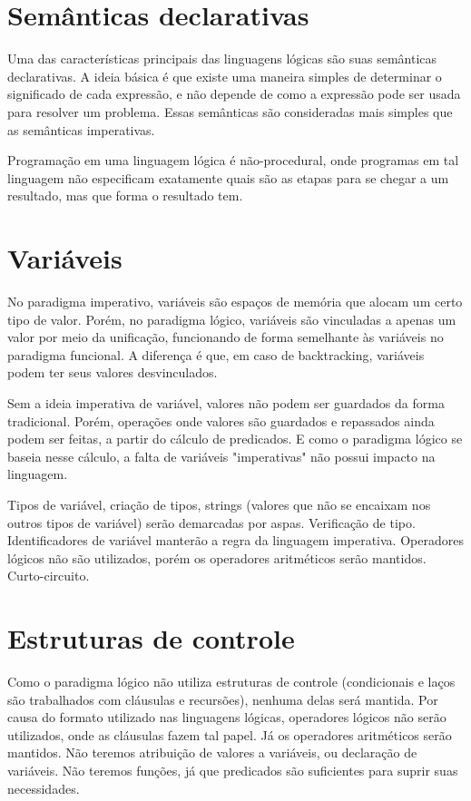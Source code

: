 \documentclass[12pt, a4paper]{article}
\begin{document}
\section{Semânticas declarativas}
Uma das características principais das linguagens lógicas são suas
semânticas declarativas. A ideia básica é que existe uma maneira
simples de determinar o significado de cada expressão, e não depende de
como a expressão pode ser usada para resolver um problema. Essas
semânticas são consideradas mais simples que as semânticas imperativas.

Programação em uma linguagem lógica é não-procedural, onde programas em
tal linguagem não especificam exatamente quais são as etapas para se
chegar a um resultado, mas que forma o resultado tem.

\section{Variáveis}
No paradigma imperativo, variáveis são espaços de memória que alocam um
certo tipo de valor. Porém, no paradigma lógico, variáveis são
vinculadas a apenas um valor por meio da unificação, funcionando de
forma semelhante às variáveis no paradigma funcional. A diferença é
que, em caso de backtracking, variáveis podem ter seus valores
desvinculados.

Sem a ideia imperativa de variável, valores não podem ser guardados da
forma tradicional. Porém, operações onde valores são guardados e
repassados ainda podem ser feitas, a partir do cálculo de predicados. E
como o paradigma lógico se baseia nesse cálculo, a falta de variáveis
"imperativas" não possui impacto na linguagem.

Tipos de variável, criação de tipos, strings (valores que não se
encaixam nos outros tipos de variável) serão demarcadas por aspas.
Verificação de tipo.  Identificadores de variável manterão a regra da
linguagem imperativa.  Operadores lógicos não são utilizados, porém os
operadores aritméticos serão mantidos. Curto-circuito.

\section{Estruturas de controle}
Como o paradigma lógico não utiliza estruturas de controle
(condicionais e laços são trabalhados com cláusulas e recursões),
nenhuma delas será mantida. Por causa do formato utilizado nas
linguagens lógicas, operadores lógicos não serão utilizados, onde as
cláusulas fazem tal papel. Já os operadores aritméticos serão mantidos.
Não teremos atribuição de valores a variáveis, ou declaração de
variáveis. Não teremos funções, já que predicados são suficientes para
suprir suas necessidades.
\end{document}
